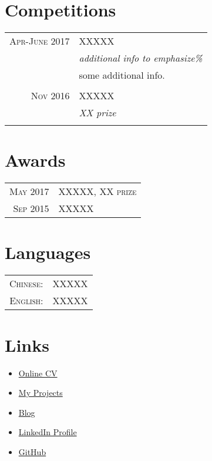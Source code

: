 \documentclass[a4paper,10pt]{article}
\begin{document}
\section{Competitions}
\begin{tabular}{r|p{11cm}}
 \textsc{Apr-June 2017} & XXXXX\\&
 \emph{additional info to emphasize\%}\\&
  \footnotesize{some additional info.}
\\\multicolumn{2}{c}{} \\
 \textsc{Nov 2016} & XXXXX\\&
 \emph{XX prize}
\\\multicolumn{2}{c}{} \\
\end{tabular}



\section{Awards}
\begin{tabular}{rl}
\textsc{May} 2017 & XXXXX, \textsc{XX prize}\\
\textsc{Sep} 2015 & XXXXX
\end{tabular}

\section{Languages}
\begin{tabular}{rl}
 \textsc{Chinese:}&XXXXX\\
\textsc{English:}&XXXXX\\
\end{tabular}

\section{Links}
\begin{itemize}
    \item \href{https://your-cv.com}{Online CV}
    \item \href{https://ddlee.cn/projects.html}{My Projects}
    \item \href{https://blog.ddlee.cn/}{Blog}
    \item \href{https://www.linkedin.com/in/your-url-goes-here}{LinkedIn Profile}
    \item \href{https://github.com/ddlee96}{GitHub}
\end{itemize}
\end{document}
